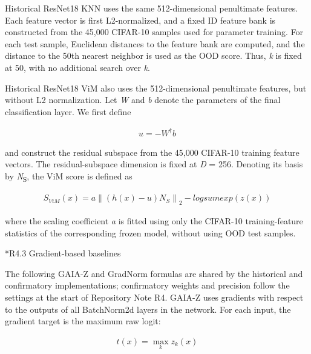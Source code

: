 \documentclass[11pt,a4paper]{article}
\makeatletter
\renewcommand\subsection{\@startsection{subsection}{2}{\z@}{-1.8ex plus -.5ex minus -.2ex}{.7ex plus .2ex}{\normalfont\normalsize\bfseries\raggedright}}
\makeatother
\begin{document}
Historical ResNet18 KNN uses the same 512-dimensional penultimate features. Each feature vector is first L2-normalized, and a fixed ID feature bank is constructed from the 45,000 CIFAR-10 samples used for parameter training. For each test sample, Euclidean distances to the feature bank are computed, and the distance to the 50th nearest neighbor is used as the OOD score. Thus, \emph{k} is fixed at 50, with no additional search over \emph{k}.

Historical ResNet18 ViM also uses the 512-dimensional penultimate features, but without L2 normalization. Let \emph{W} and \emph{b} denote the parameters of the final classification layer. We first define

\begin{equation}
\begin{array}{r}
u = - W^{\dagger}b
\end{array}
\label{eq:supp19}
\end{equation}

and construct the residual subspace from the 45,000 CIFAR-10 training feature vectors. The residual-subspace dimension is fixed at \emph{D} = 256. Denoting its basis by \emph{N}\textsubscript{S}, the ViM score is defined as

\begin{equation}
\begin{array}{r}
S_{ViM}(x) = a\left\| (h(x) - u)N_{S} \right\|_{2} - logsumexp(z(x))
\end{array}
\label{eq:supp20}
\end{equation}

where the scaling coefficient \emph{a} is fitted using only the CIFAR-10 training-feature statistics of the corresponding frozen model, without using OOD test samples.

\subsection*{R4.3 Gradient-based baselines}\label{s4.3-gradient-based-baselines}

The following GAIA-Z and GradNorm formulas are shared by the historical and confirmatory implementations; confirmatory weights and precision follow the settings at the start of Repository Note R4. GAIA-Z uses gradients with respect to the outputs of all BatchNorm2d layers in the network. For each input, the gradient target is the maximum raw logit:

\begin{equation}
\begin{array}{r}
t(x) = \max_{k}z_{k}(x)
\end{array}
\label{eq:supp21}
\end{equation}
\end{document}

